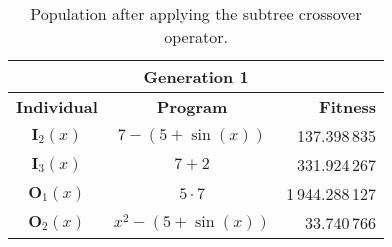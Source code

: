 \begin{table}[ht!]
  \centering
  \begin{tabular}{c|c|r}
    \multicolumn{3}{c}{\textbf{Generation 1}}	\\
    \hline
    \hline
    \textbf{Individual}	& \textbf{Program}	& \textbf{Fitness}	\\
    \hline
    \(\mathbf{I}_2(x)\)	& \(7 - (5 + \sin(x))\)	& 137.398\,835	\\
    \(\mathbf{I}_3(x)\)	& \(7 + 2\)	& 331.924\,267	\\
    \(\mathbf{O}_1(x)\)	& \(5 \cdot 7\)	& 1\,944.288\,127	\\
    \(\mathbf{O}_2(x)\)	& \(x^2 - (5 + \sin(x))\)	& 33.740\,766	\\
  \end{tabular}
  \caption{Population after applying the subtree crossover operator.}
  \label{tab:bg:gp:variation:cx:subtree:fitness}
\end{table}